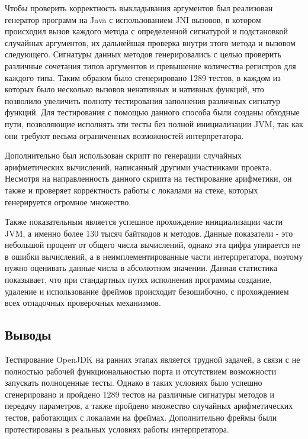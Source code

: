 Чтобы проверить корректность выкладывания аргументов был реализован генератор программ на Java с использованием JNI вызовов, в котором происходил вызов каждого метода с определенной сигнатурой и подстановкой случайных аргументов, их дальнейшая проверка внутри этого метода и вызовом следующего. Сигнатуры данных методов генерировались с целью проверить различные сочетания типов аргументов и превышение количества регистров для каждого типа. Таким образом было сгенерировано 1289 тестов, в каждом из которых было несколько вызовов ненативных и нативных функций, что позволило увеличить полноту тестирования заполнения различных сигнатур функций. Для тестирования с помощью данного способа были созданы обходные пути, позволяющие исполнять эти тесты без полной инициализации JVM, так как они требуют весьма ограниченных возможностей интерпретатора.

Дополнительно был использован скрипт по генерации случайных арифметических вычислений, написанный другими участниками проекта. Несмотря на направленность данного скрипта на тестирование арифметики, он также и проверяет корректность работы с локалами на стеке, которых генерируется огромное множество.

Также показательным является успешное прохождение инициализации части JVM, а именно более 130 тысяч байткодов и  методов. Данные показатели - это небольшой процент от общего числа вычислений, однако эта цифра упирается не в ошибки вычислений, а в неимплементированные части интерпретатора, поэтому нужно оценивать данные числа в абсолютном значении. Данная статистика показывает, что при стандартных путях исполнения программы создание, удаление и использование фреймов происходит безошибочно, с прохождением всех отладочных проверочных механизмов.



\subsection{Выводы}

Тестирование OpenJDK на ранних этапах является трудной задачей, в связи с не полностью рабочей функциональностью порта и отсутствием возможности запускать полноценные тесты. Однако в таких условиях было успешно сгенерировано и пройдено 1289 тестов на различные сигнатуры методов и передачу параметров, а также пройдено множество случайных арифметических тестов, работающих с локалами на фреймах. Дополнительно фреймы были протестированы в реальных условиях работы интерпретатора.



